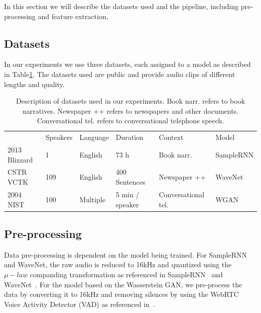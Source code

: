 In this section we will describe the datasets used and the pipeline, including pre-processing and feature extraction, 

\subsection{Datasets}
In our experiments we use three datasets, each assigned to a model as described in Table\ref{tbl:datasets}. The datasets used are public and provide audio clips of different lengths and quality.

\begin{table}[!h]
\centering
\caption{Description of datasets used in our experiments. Book narr. refers to book narratives. Newspaper ++ refers to newspapers and other documents. Conversational tel. refers to conversational telephone speech.}
\label{tbl:datasets}
\begin{tabular}{llllll}
                                                                     & \cellcolor[HTML]{C0C0C0}Speakers & \cellcolor[HTML]{C0C0C0}Language & \cellcolor[HTML]{C0C0C0}Duration & \cellcolor[HTML]{C0C0C0}Context & \cellcolor[HTML]{C0C0C0}Model \\ \cline{2-6} 
\multicolumn{1}{l|}{\cellcolor[HTML]{C0C0C0}2013 Blizzard} & 1                                & English                          & 73 h                             & Book narr.                  & SampleRNN                     \\
\multicolumn{1}{l|}{\cellcolor[HTML]{C0C0C0}CSTR VCTK}               & 109                              & English                          & 400 Sentences                    & Newspaper ++               & WaveNet                       \\
\multicolumn{1}{l|}{\cellcolor[HTML]{C0C0C0}2004 NIST}               & 100                              & Multiple                         & 5 min / speaker                  & Conversational tel. & WGAN                         
\end{tabular}
\end{table}

\subsection{Pre-processing}
\label{sub:processdata}
Data pre-processing is dependent on the model being trained. For SampleRNN and WaveNet, the raw audio is reduced to 16kHz and quantized using the $\mu-law$ companding transformation as referenced in SampleRNN~\cite{mehri2016samplernn} and WaveNet~\cite{van2016wavenet}. For the model based on the Wasserstein GAN, we pre-process the data by converting it to 16kHz and removing silences by using the WebRTC Voice Activity Detector (VAD) as referenced in~\cite{zeidan2014webrtc}.

